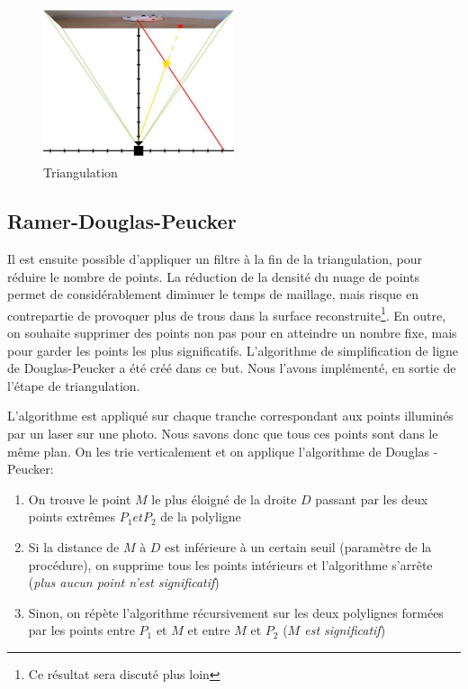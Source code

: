 \documentclass[a4paper,10pt]{report}
\begin{document}
\begin{figure}[H]
\centering
\includegraphics[width=0.5\textwidth]{triangulation_jpg.jpg}
\caption{Triangulation}
\label{unipolar}
\end{figure}

\subsection{Ramer-Douglas-Peucker}
Il est ensuite possible d'appliquer un filtre à la fin de la triangulation, pour réduire le nombre de points. La réduction de la densité du nuage de points permet de considérablement diminuer le temps de maillage, mais risque en contrepartie de provoquer plus de trous dans la surface reconstruite\footnote{Ce résultat sera discuté plus loin}. En outre, on souhaite supprimer des points non pas pour en atteindre un nombre fixe, mais pour garder les points les plus significatifs. L'algorithme de simplification de ligne de Douglas-Peucker\cite{douglaspeucker} a été créé dans ce but. Nous l'avons implémenté, en sortie de l'étape de triangulation.

L'algorithme est appliqué sur chaque tranche correspondant aux points illuminés par un laser sur une photo. Nous savons donc que tous ces points sont dans le même plan. On les trie verticalement et on applique l'algorithme de Douglas - Peucker:

\begin{enumerate}
	\item On trouve le point $M$ le plus éloigné de la droite $D$ passant par les deux points extrêmes $P_1 et P_2$ de la polyligne
  \item Si la distance de $M$ à $D$ est inférieure à un certain seuil (paramètre de la procédure), on supprime tous les points intérieurs et l'algorithme s'arrête (\textit{plus aucun point n'est significatif})
  \item Sinon, on répète l'algorithme récursivement sur les deux polylignes formées par les points entre $P_1$ et $M$ et entre $M$ et $P_2$ (\textit{$M$ est significatif})
\end{enumerate}
\end{document}
